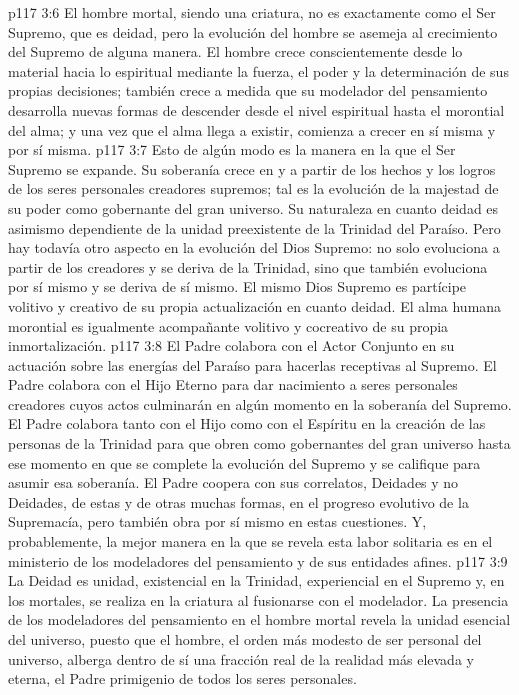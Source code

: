 \vs p117 3:6 El hombre mortal, siendo una criatura, no es exactamente como el Ser Supremo, que es deidad, pero la evolución del hombre se asemeja al crecimiento del Supremo de alguna manera. El hombre crece conscientemente desde lo material hacia lo espiritual mediante la fuerza, el poder y la determinación de sus propias decisiones; también crece a medida que su modelador del pensamiento desarrolla nuevas formas de descender desde el nivel espiritual hasta el morontial del alma; y una vez que el alma llega a existir, comienza a crecer en sí misma y por sí misma.
\vs p117 3:7 Esto de algún modo es la manera en la que el Ser Supremo se expande. Su soberanía crece en y a partir de los hechos y los logros de los seres personales creadores supremos; tal es la evolución de la majestad de su poder como gobernante del gran universo. Su naturaleza en cuanto deidad es asimismo dependiente de la unidad preexistente de la Trinidad del Paraíso. Pero hay todavía otro aspecto en la evolución del Dios Supremo: no solo evoluciona a partir de los creadores y se deriva de la Trinidad, sino que también evoluciona por sí mismo y se deriva de sí mismo. El mismo Dios Supremo es partícipe volitivo y creativo de su propia actualización en cuanto deidad. El alma humana morontial es igualmente acompañante volitivo y cocreativo de su propia inmortalización.
\vs p117 3:8 \pc El Padre colabora con el Actor Conjunto en su actuación sobre las energías del Paraíso para hacerlas receptivas al Supremo. El Padre colabora con el Hijo Eterno para dar nacimiento a seres personales creadores cuyos actos culminarán en algún momento en la soberanía del Supremo. El Padre colabora tanto con el Hijo como con el Espíritu en la creación de las personas de la Trinidad para que obren como gobernantes del gran universo hasta ese momento en que se complete la evolución del Supremo y se califique para asumir esa soberanía. El Padre coopera con sus correlatos, Deidades y no Deidades, de estas y de otras muchas formas, en el progreso evolutivo de la Supremacía, pero también obra por sí mismo en estas cuestiones. Y, probablemente, la mejor manera en la que se revela esta labor solitaria es en el ministerio de los modeladores del pensamiento y de sus entidades afines.
\vs p117 3:9 La Deidad es unidad, existencial en la Trinidad, experiencial en el Supremo y, en los mortales, se realiza en la criatura al fusionarse con el modelador. La presencia de los modeladores del pensamiento en el hombre mortal revela la unidad esencial del universo, puesto que el hombre, el orden más modesto de ser personal del universo, alberga dentro de sí una fracción real de la realidad más elevada y eterna, el Padre primigenio de todos los seres personales.
